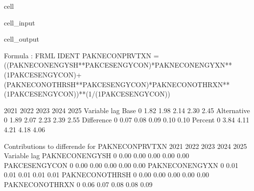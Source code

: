 \documentclass[letterpaper,10pt,english]{jupyterBook}
\begin{document}
\begin{sphinxuseclass}{cell}\begin{sphinxVerbatimInput}

\begin{sphinxuseclass}{cell_input}
\begin{sphinxVerbatim}[commandchars=\\\{\}]
 
    \PYG{p}{[}\PYG{p}{]}
\end{sphinxVerbatim}

\end{sphinxuseclass}\end{sphinxVerbatimInput}
\begin{sphinxVerbatimOutput}

\begin{sphinxuseclass}{cell_output}
\begin{sphinxVerbatim}[commandchars=\\\{\}]
Formula        : FRML \PYGZlt{}IDENT\PYGZgt{} PAKNECONPRVTXN = ((PAKNECONENGYSH**PAKCESENGYCON)*PAKNECONENGYXN**(1\PYGZhy{}PAKCESENGYCON)+(PAKNECONOTHRSH**PAKCESENGYCON)*PAKNECONOTHRXN**(1\PYGZhy{}PAKCESENGYCON))**(1/(1\PYGZhy{}PAKCESENGYCON)) \PYGZdl{} 

                      2021       2022       2023       2024       2025
Variable    lag                                                       
Base        0         1.82       1.98       2.14       2.30       2.45
Alternative 0         1.89       2.07       2.23       2.39       2.55
Difference  0         0.07       0.08       0.09       0.10       0.10
Percent     0         3.84       4.11       4.21       4.18       4.06

 Contributions to differende for  PAKNECONPRVTXN
                         2021       2022       2023       2024       2025
Variable       lag                                                       
PAKNECONENGYSH 0        \PYGZhy{}0.00      \PYGZhy{}0.00      \PYGZhy{}0.00      \PYGZhy{}0.00      \PYGZhy{}0.00
PAKCESENGYCON  0        \PYGZhy{}0.00      \PYGZhy{}0.00      \PYGZhy{}0.00      \PYGZhy{}0.00      \PYGZhy{}0.00
PAKNECONENGYXN 0         0.01       0.01       0.01       0.01       0.01
PAKNECONOTHRSH 0        \PYGZhy{}0.00      \PYGZhy{}0.00      \PYGZhy{}0.00      \PYGZhy{}0.00      \PYGZhy{}0.00
PAKNECONOTHRXN 0         0.06       0.07       0.08       0.08       0.09


\end{sphinxVerbatim}
\end{sphinxuseclass}
\end{sphinxVerbatimOutput}
\end{sphinxuseclass}
\end{document}
